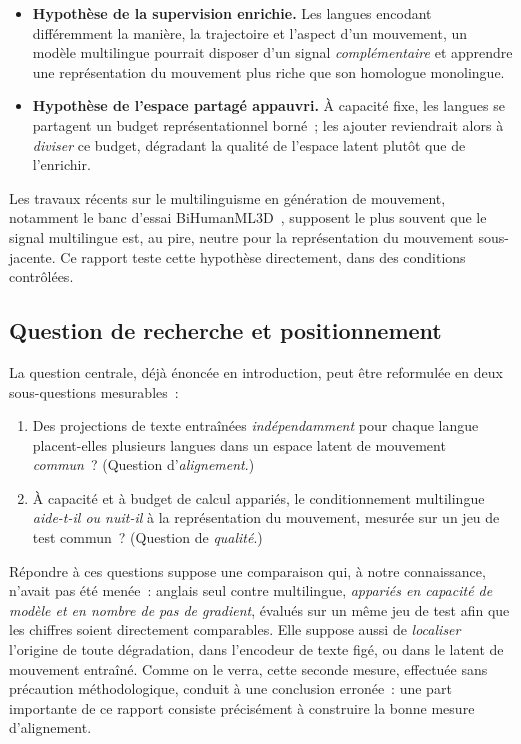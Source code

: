 \documentclass[12pt,a4paper,oneside]{report}
\theoremstyle{definition}
\theoremstyle{plain}
\begin{document}
\begin{itemize}[leftmargin=*]
\item \textbf{Hypothèse de la supervision enrichie.} Les langues encodant
différemment la manière, la trajectoire et l'aspect d'un mouvement, un modèle
multilingue pourrait disposer d'un signal \emph{complémentaire} et apprendre une
représentation du mouvement plus riche que son homologue monolingue.
\item \textbf{Hypothèse de l'espace partagé appauvri.} À capacité fixe, les
langues se partagent un budget représentationnel borné~; les ajouter reviendrait
alors à \emph{diviser} ce budget, dégradant la qualité de l'espace latent plutôt
que de l'enrichir.
\end{itemize}

Les travaux récents sur le multilinguisme en génération de mouvement, notamment
le banc d'essai BiHumanML3D~\cite{weng2026bihumanml3d}, supposent le plus souvent
que le signal multilingue est, au pire, neutre pour la représentation du
mouvement sous-jacente. Ce rapport teste cette hypothèse directement, dans des
conditions contrôlées.

\subsection{Question de recherche et positionnement}

La question centrale, déjà énoncée en introduction, peut être reformulée en deux
sous-questions mesurables~:

\begin{enumerate}[leftmargin=*,label=\textbf{RQ\arabic*.}]
\item Des projections de texte entraînées \emph{indépendamment} pour chaque
langue placent-elles plusieurs langues dans un espace latent de mouvement
\emph{commun}~? (Question d'\emph{alignement}.)
\item À capacité et à budget de calcul appariés, le conditionnement multilingue
\emph{aide-t-il ou nuit-il} à la représentation du mouvement, mesurée sur un jeu
de test commun~? (Question de \emph{qualité}.)
\end{enumerate}

Répondre à ces questions suppose une comparaison qui, à notre connaissance,
n'avait pas été menée~: anglais seul contre multilingue, \emph{appariés en
capacité de modèle et en nombre de pas de gradient}, évalués sur un même jeu de
test afin que les chiffres soient directement comparables. Elle suppose aussi de
\emph{localiser} l'origine de toute dégradation, dans l'encodeur de texte
figé, ou dans le latent de mouvement entraîné. Comme on le verra, cette seconde
mesure, effectuée sans précaution méthodologique, conduit à une conclusion
erronée~: une part importante de ce rapport consiste précisément à construire la
bonne mesure d'alignement.
\end{document}
